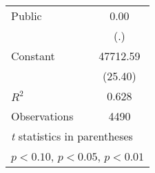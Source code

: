 \begin{table}[htbp]
\begin{tabular}{l*{1}{c}}
Public              &        0.00         \\
                    &         (.)         \\
Constant            &    47712.59\sym{***}\\
                    &     (25.40)         \\
\hline
\(R^{2}\)           &       0.628         \\
Observations        &        4490         \\
\hline\hline
\multicolumn{2}{l}{\footnotesize \textit{t} statistics in parentheses}\\
\multicolumn{2}{l}{\footnotesize \sym{*} \(p<0.10\), \sym{**} \(p<0.05\), \sym{***} \(p<0.01\)}\\
\end{tabular}
\end{table}

